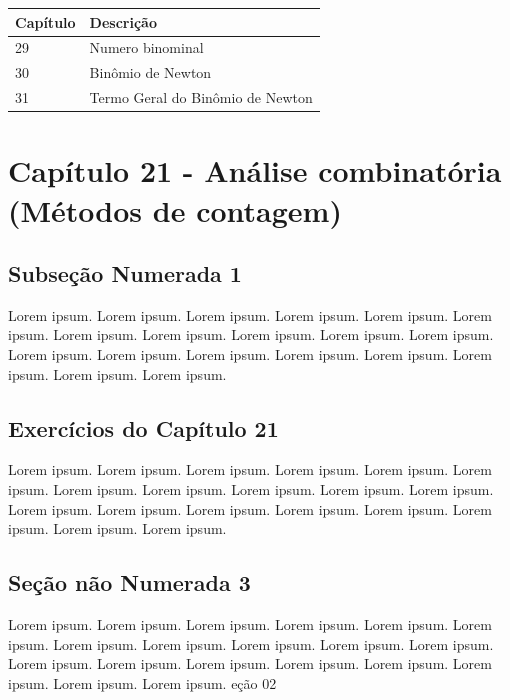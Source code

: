 \documentclass[
]{book}
\begin{document}
\begin{longtable}[]{@{}ll@{}}
\toprule()
Capítulo & Descrição \\
\midrule()
\endhead
29 & Numero binominal \\
30 & Binômio de Newton \\
31 & Termo Geral do Binômio de Newton \\
\bottomrule()
\end{longtable}

\hypertarget{capuxedtulo-21---anuxe1lise-combinatuxf3ria-muxe9todos-de-contagem-1}{%
\section{Capítulo 21 - Análise combinatória (Métodos de contagem)}\label{capuxedtulo-21---anuxe1lise-combinatuxf3ria-muxe9todos-de-contagem-1}}

\hypertarget{subseuxe7uxe3o-numerada-1-2}{%
\subsection{Subseção Numerada 1}\label{subseuxe7uxe3o-numerada-1-2}}

Lorem ipsum. Lorem ipsum. Lorem ipsum. Lorem ipsum. Lorem ipsum. Lorem ipsum. Lorem ipsum. Lorem ipsum. Lorem ipsum. Lorem ipsum. Lorem ipsum. Lorem ipsum. Lorem ipsum. Lorem ipsum. Lorem ipsum. Lorem ipsum. Lorem ipsum. Lorem ipsum. Lorem ipsum.

\hypertarget{exercuxedcios-do-capuxedtulo-21}{%
\subsection{Exercícios do Capítulo 21}\label{exercuxedcios-do-capuxedtulo-21}}

Lorem ipsum. Lorem ipsum. Lorem ipsum. Lorem ipsum. Lorem ipsum. Lorem ipsum. Lorem ipsum. Lorem ipsum. Lorem ipsum. Lorem ipsum. Lorem ipsum. Lorem ipsum. Lorem ipsum. Lorem ipsum. Lorem ipsum. Lorem ipsum. Lorem ipsum. Lorem ipsum. Lorem ipsum.

\hypertarget{seuxe7uxe3o-nuxe3o-numerada-3-2}{%
\subsection*{Seção não Numerada 3}\label{seuxe7uxe3o-nuxe3o-numerada-3-2}}

Lorem ipsum. Lorem ipsum. Lorem ipsum. Lorem ipsum. Lorem ipsum. Lorem ipsum. Lorem ipsum. Lorem ipsum. Lorem ipsum. Lorem ipsum. Lorem ipsum. Lorem ipsum. Lorem ipsum. Lorem ipsum. Lorem ipsum. Lorem ipsum. Lorem ipsum. Lorem ipsum. Lorem ipsum.
eção 02
\end{document}
